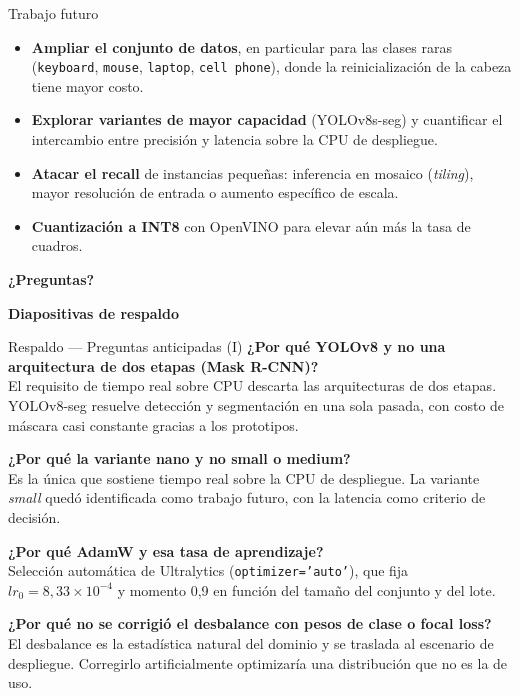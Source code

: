 \documentclass[aspectratio=169,11pt]{beamer}
\begin{document}
\begin{frame}{Trabajo futuro}
  \begin{itemize}
    \item \textbf{Ampliar el conjunto de datos}, en particular para las clases raras
          (\texttt{keyboard}, \texttt{mouse}, \texttt{laptop}, \texttt{cell phone}), donde
          la reinicialización de la cabeza tiene mayor costo.
    \item \textbf{Explorar variantes de mayor capacidad} (YOLOv8s-seg) y cuantificar el
          intercambio entre precisión y latencia sobre la CPU de despliegue.
    \item \textbf{Atacar el recall} de instancias pequeñas: inferencia en mosaico
          (\emph{tiling}), mayor resolución de entrada o aumento específico de escala.
    \item \textbf{Cuantización a INT8} con OpenVINO para elevar aún más la tasa de cuadros.
  \end{itemize}
  \vfill
  \centering
  {\Large\color{azul}\bfseries ¿Preguntas?}
\end{frame}

\appendix

\begin{frame}[plain]
  \centering
  \vfill
  {\Large\bfseries\color{gris} Diapositivas de respaldo}
  \vfill
\end{frame}

\begin{frame}{Respaldo --- Preguntas anticipadas (I)}
  \small
  \textbf{¿Por qué YOLOv8 y no una arquitectura de dos etapas (Mask R-CNN)?}\\
  El requisito de tiempo real sobre CPU descarta las arquitecturas de dos etapas. YOLOv8-seg
  resuelve detección y segmentación en una sola pasada, con costo de máscara casi constante
  gracias a los prototipos.
  \vspace{0.6em}

  \textbf{¿Por qué la variante nano y no small o medium?}\\
  Es la única que sostiene tiempo real sobre la CPU de despliegue. La variante \emph{small}
  quedó identificada como trabajo futuro, con la latencia como criterio de decisión.
  \vspace{0.6em}

  \textbf{¿Por qué AdamW y esa tasa de aprendizaje?}\\
  Selección automática de Ultralytics (\texttt{optimizer='auto'}), que fija
  $lr_0 = 8{,}33\times10^{-4}$ y momento 0,9 en función del tamaño del conjunto y del lote.
  \vspace{0.6em}

  \textbf{¿Por qué no se corrigió el desbalance con pesos de clase o focal loss?}\\
  El desbalance es la estadística natural del dominio y se traslada al escenario de
  despliegue. Corregirlo artificialmente optimizaría una distribución que no es la de uso.
\end{frame}
\end{document}
